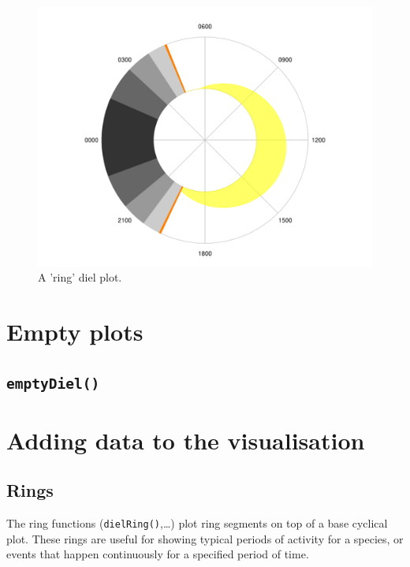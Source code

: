 \documentclass[
]{book}
\begin{document}
\begin{figure}

{\centering \includegraphics[width=0.9\linewidth]{_main_files/figure-latex/diel-plot-ring-1} 

}

\caption{A 'ring' diel plot.}\label{fig:diel-plot-ring}
\end{figure}

\hypertarget{empty-plots}{%
\section{Empty plots}\label{empty-plots}}

\hypertarget{emptydiel}{%
\subsection{\texorpdfstring{\texttt{emptyDiel()}}{emptyDiel()}}\label{emptydiel}}

\hypertarget{adding-to-cyclical}{%
\section{Adding data to the visualisation}\label{adding-to-cyclical}}

\hypertarget{rings}{%
\subsection{Rings}\label{rings}}

The ring functions (\texttt{dielRing()},\ldots) plot ring segments on top of a base cyclical plot. These rings are useful for showing typical periods of activity for a species, or events that happen continuously for a specified period of time.
\end{document}
